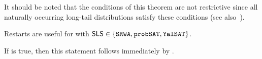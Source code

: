 It should be noted that the conditions of this theorem are not restrictive since all naturally occurring long-tail distributions satisfy these conditions (see also~\cite{nair2020fundamentals}).


\begin{conjecture}
	Restarts are useful for \Alfa{} with $\textsf{SLS} \in \{ \texttt{SRWA}, \texttt{probSAT}, \texttt{YalSAT} \}$.
\end{conjecture}

If   is true, then this statement follows immediately by .


